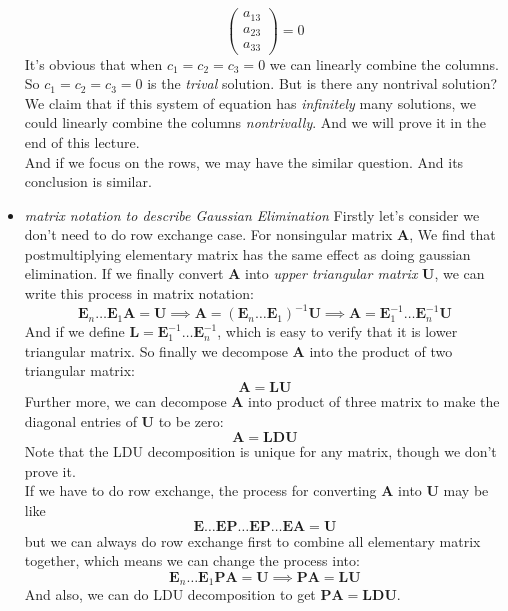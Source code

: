 \begin{itemize}
\[\begin{pmatrix}
a_{13}\\a_{23}\\a_{33}
\end{pmatrix} = 0
\]
It's obvious that when $c_1=c_2=c_3=0$ we can linearly combine the columns. So $c_1=c_2=c_3=0$ is the \textit{trival} solution. But is there any nontrival solution? We claim that if this system of equation has \textit{infinitely} many solutions, we could linearly combine the columns \textit{nontrivally}. And we will prove it in the end of this lecture.\\
And if we focus on the rows, we may have the similar question. And its conclusion is similar.
\item
\emph{matrix notation to describe Gaussian Elimination}
Firstly let's consider we don't need to do row exchange case. For nonsingular matrix $\bm A$, We find that postmultiplying elementary matrix has the same effect as doing gaussian elimination. If we finally convert $\bm A$ into \textit{upper triangular matrix} $\bm U$, we can write this process in matrix notation:
\[
\bm E_n \ldots \bm E_1\bm A = \bm U\implies \bm A = (\bm E_n \ldots \bm E_1)^{-1}\bm U
\implies \bm A = \bm E_1^{-1} \ldots \bm E_n^{-1}\bm U
\]
And if we define $\bm L = \bm E_1^{-1} \ldots \bm E_n^{-1}$, which is easy to verify that it is lower triangular matrix. So finally we decompose $\bm A$ into the product of two triangular matrix:
\[
\bm A = \bm L\bm U
\]
Further more, we can decompose $\bm A$ into product of three matrix to make the diagonal entries of $\bm U$ to be zero:
\[
\bm A = \bm L\bm D\bm U
\]
Note that the LDU decomposition is unique for any matrix, though we don't prove it.\\
If we have to do row exchange, the process for converting $\bm A$ into $\bm U$ may be like 
\[\bm E\ldots \bm E\bm P\ldots \bm E\bm P \ldots \bm E\bm A = \bm U\] but we can always do row exchange first to combine all elementary matrix together, which means we can change the process into:
\[
\bm E_n \ldots \bm E_1\bm P\bm A = \bm U\implies \bm P\bm A = \bm L\bm U
\]
And also, we can do LDU decomposition to get $ \bm P\bm A = \bm L\bm D\bm U$.
\end{itemize}
